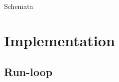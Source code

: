 \documentclass[ 
xcolor={usenames,dvipsnames,svgnames,tablem} 
,handout
]{beamer}
\begin{document}
\begin{frame}
	
	\begin{block}{}
		\vspace{-1.5em}
		
	\end{block}
	
	\begin{block}{Schemata}
		\vspace{-1em}
		
	\end{block}
\end{frame}

\begin{frame}
	
	
	
	\end{frame}







\section{Implementation}
\subsection{Run-loop}




\end{document}
